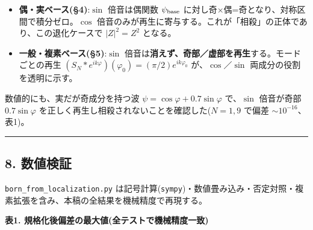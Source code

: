 \documentclass[
]{ltjsarticle}
\providecommand{\tightlist}{%
  \setlength{\itemsep}{0pt}\setlength{\parskip}{0pt}}
\begin{document}
\begin{itemize}
\tightlist
\item
  \textbf{偶・実ベース(§4)}:\(\sin\) 倍音は偶関数 \(\psi_{\rm base}\)
  に対し奇×偶=奇となり、対称区間で積分ゼロ。\(\cos\)
  倍音のみが再生に寄与する。これが「相殺」の正体であり、この退化ケースで
  \(|Z|^2=Z^2\) となる。
\item
  \textbf{一般・複素ベース(§5)}:\(\sin\)
  倍音は\textbf{消えず、奇部／虚部を再生}する。モードごとの再生
  \((S_N*e^{ik\varphi})(\varphi_0)=(\pi/2)e^{ik\varphi_0}\)
  が、\(\cos\)／\(\sin\) 両成分の役割を透明に示す。
\end{itemize}

数値的にも、実だが奇成分を持つ波 \(\psi=\cos\varphi+0.7\sin\varphi\)
で、\(\sin\) 倍音が奇部 \(0.7\sin\varphi\)
を正しく再生し相殺されないことを確認した(\(N=1,9\) で偏差
\(\sim10^{-16}\)、表1)。

\begin{center}\rule{0.5\linewidth}{0.5pt}\end{center}

\subsection{8. 数値検証}\label{ux6570ux5024ux691cux8a3c}

\texttt{born\_from\_localization.py}
は記号計算(\texttt{sympy})・数値畳み込み・否定対照・複素拡張を含み、本稿の全結果を機械精度で再現する。

\textbf{表1. 規格化後偏差の最大値(全テストで機械精度一致)}
\end{document}

